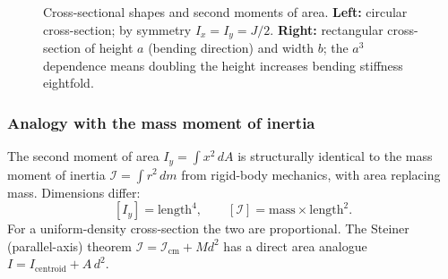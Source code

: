 \documentclass[../main.tex]{subfiles}
\begin{document}
\begin{figure}[htb]
\centering
{}
\caption{Cross-sectional shapes and second moments of area. \textbf{Left:} circular cross-section; by symmetry $I_x=I_y=J/2$. \textbf{Right:} rectangular cross-section of height $a$ (bending direction) and width $b$; the $a^3$ dependence means doubling the height increases bending stiffness eightfold.}
\label{fig:lec08_sections}
\end{figure}

\subsubsection*{Analogy with the mass moment of inertia}

The second moment of area $I_y = \int x^2\,dA$ is structurally identical to the mass moment of inertia $\mathcal{I} = \int r^2\,dm$ from rigid-body mechanics, with area replacing mass. Dimensions differ:
\[
    [I_y] = \mathrm{length}^4, \qquad [\mathcal{I}] = \mathrm{mass}\times\mathrm{length}^2.
\]
For a uniform-density cross-section the two are proportional. The Steiner (parallel-axis) theorem $\mathcal{I} = \mathcal{I}_\mathrm{cm} + Md^2$ has a direct area analogue $I = I_\mathrm{centroid} + A\,d^2$.

\end{document}
